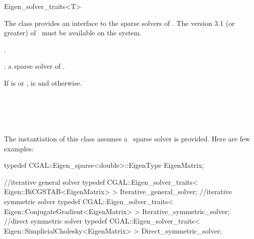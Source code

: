 \ccRefPageBegin
\begin{ccRefClass}{Eigen_solver_traits<T>}

\ccDefinition

The class  provides an interface to the sparse solvers of \eigen. 
The version 3.1 (or greater) of \eigen\ must be available on the system.


\ccIsModel
{}.

\ccParameters
{}: a sparse solver of \eigen.

\ccTypes
{}
{If  is  or ,  is 
and  otherwise.
}

\ccSeeAlso
\eigenpage\\
  \\
  \\
  \\

\ccExample
The instantiation of this class assumes a \eigen\ sparse solver is provided. Here are few examples:

\begin{ccExampleCode}
typedef CGAL::Eigen_sparse<double>::EigenType EigenMatrix;

//iterative general solver
typedef CGAL::Eigen_solver_traits< Eigen::BiCGSTAB<EigenMatrix> > Iterative_general_solver;
//iterative symmetric solver
typedef CGAL::Eigen_solver_traits< Eigen::ConjugateGradient<EigenMatrix> > Iterative_symmetric_solver;
//direct symmetric solver
typedef CGAL::Eigen_solver_traits< Eigen::SimplicialCholesky<EigenMatrix> > Direct_symmetric_solver;
\end{ccExampleCode}


\end{ccRefClass}

\ccRefPageEnd


